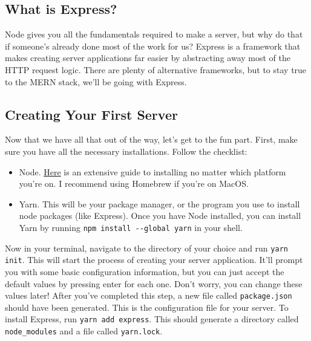 \subsection*{What is Express?}

Node gives you all the fundamentals required to make a server, but why do that if someone's already done most of the work for us? Express is a framework that makes creating server applications far easier by abstracting away most of the HTTP request logic. There are plenty of alternative frameworks, but to stay true to the MERN stack, we'll be going with Express.

\subsection*{Creating Your First Server}

Now that we have all that out of the way, let's get to the fun part. First, make sure you have all the necessary installations. Follow the checklist:

\begin{itemize}
    \item Node. \href{https://nodejs.org/en/download/package-manager/#macos}{Here} is an extensive guide to installing no matter which platform you're on. I recommend using Homebrew if you're on MacOS.
    \item Yarn. This will be your package manager, or the program you use to install node packages (like Express). Once you have Node installed, you can install Yarn by running \texttt{npm install -{}-global yarn} in your shell. 
\end{itemize}

Now in your terminal, navigate to the directory of your choice and run \texttt{yarn init}. This will start the process of creating your server application. It'll prompt you with some basic configuration information, but you can just accept the default values by pressing enter for each one. Don't worry, you can change these values later! After you've completed this step, a new file called \texttt{package.json} should have been generated. This is the configuration file for your server. To install Express, run \texttt{yarn add express}. This should generate a directory called \texttt{node\_modules} and a file called \texttt{yarn.lock}.


